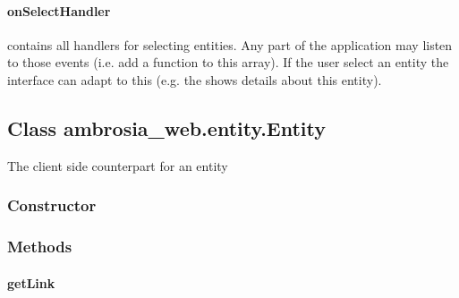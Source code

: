 \documentclass[letterpaper,10pt,english]{sphinxmanual}
\begin{document}
\paragraph{onSelectHandler}
\label{ambrosia_web.entity:onselecthandler}

\begin{fulllineitems}
\label{ambrosia_web.entity:onSelectHandler}
\end{fulllineitems}


contains all handlers for selecting entities. Any part of the application may listen to those events (i.e. add a
function to this array). If the user select an entity the interface can adapt to this (e.g. the
{\hyperref[ambrosia_web.view.entityview.EntityView:ambrosia_web.view.entityview.EntityView]{}} shows details about this entity).


\subsection{Class ambrosia\_web.entity.Entity}
\label{ambrosia_web.entity.Entity::doc}\label{ambrosia_web.entity.Entity:class-ambrosia-web-entity-entity}
The client side counterpart for an entity




{\hyperref[ambrosia.model:ambrosia.model.Entity]{}}




\subsubsection{Constructor}
\label{ambrosia_web.entity.Entity:constructor}

\begin{fulllineitems}
\label{ambrosia_web.entity.Entity:ambrosia_web.entity.Entity}
\end{fulllineitems}



\subsubsection{Methods}
\label{ambrosia_web.entity.Entity:methods}

\paragraph{getLink}
\label{ambrosia_web.entity.Entity:getlink}
\end{document}
